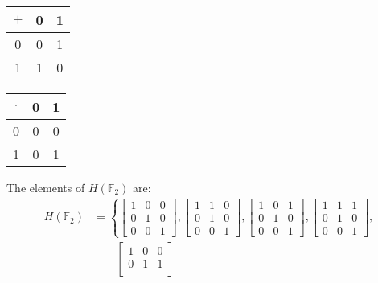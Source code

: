 \documentclass[12pt,letterpaper]{article}
\begin{document}
\begin{enumerate}
\begin{enumerate}
          \begin{tabular}{c | c | c |}
            $+$ & 0 & 1 \\
            \hline
            0 & 0 & 1 \\
            \hline
            1 & 1 & 0 \\
            \hline
          \end{tabular}
          \qquad
          \begin{tabular}{c | c | c |}
            $\cdot$ & 0 & 1 \\
            \hline
            0 & 0 & 0 \\
            \hline
            1 & 0 & 1 \\
            \hline
          \end{tabular}

          The elements of $H(\mathbb{F}_2)$ are:
          \begin{align*}
            H(\mathbb{F}_2) &=
              \left\{
                \begin{bmatrix}
                  1 & 0 & 0 \\
                  0 & 1 & 0 \\
                  0 & 0 & 1
                \end{bmatrix},
                \begin{bmatrix}
                  1 & 1 & 0 \\
                  0 & 1 & 0 \\
                  0 & 0 & 1
                \end{bmatrix},
                \begin{bmatrix}
                  1 & 0 & 1 \\
                  0 & 1 & 0 \\
                  0 & 0 & 1
                \end{bmatrix},
                \begin{bmatrix}
                  1 & 1 & 1 \\
                  0 & 1 & 0 \\
                  0 & 0 & 1
                \end{bmatrix},
                \right. \\
              &
              \qquad \left.
                \begin{bmatrix}
                  1 & 0 & 0 \\
                  0 & 1 & 1 \\

\end{bmatrix}
\end{align*}
\end{enumerate}
\end{enumerate}
\end{document}
